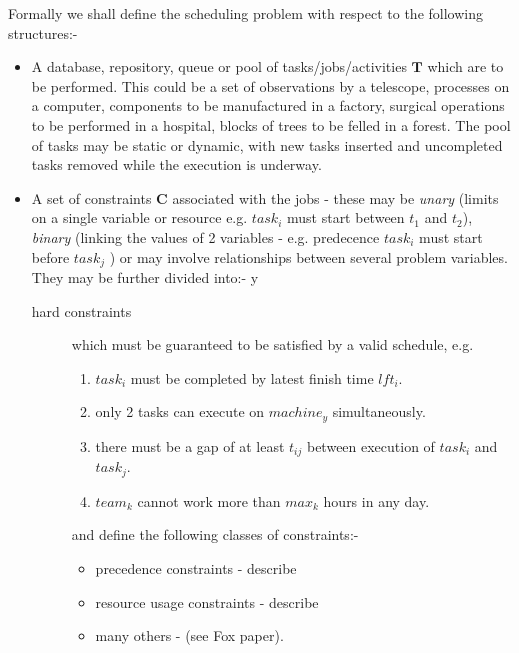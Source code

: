 Formally we shall define the scheduling problem with respect to the following structures:-

\begin{itemize}
\item A database, repository, queue or pool of tasks/jobs/activities $\mathbf{T}$ which are to be performed. This could be a set of observations by a telescope, processes on a computer, components to be manufactured in a factory, surgical operations to be performed in a hospital, blocks of trees to be felled in a forest. The pool of tasks may be static or dynamic, with new tasks inserted and uncompleted tasks removed while the execution is underway.

 \item A set of constraints $\mathbf{C}$ associated with the jobs - these may be \emph{unary} (limits on a single variable or resource e.g. $task_i$ must start between $t_1$ and $t_2$), \emph{binary} (linking the values of 2 variables - e.g. predecence $task_i$ must start before $task_j$ ) or may involve relationships between several problem variables. They may be further divided into:-
y\begin{description} 
\item[hard constraints] which must be guaranteed to be satisfied by a valid schedule, e.g. 
\begin{enumerate}
\item $task_i$ must be completed by latest finish time $lft_i$.
\item only 2 tasks can execute on $machine_y$ simultaneously.
\item there must be a gap of at least $t_{ij}$ between execution of $task_i$ and $task_j$.
\item $team_k$ cannot work more than $max_k$ hours in any day.
\end{enumerate}

\cite{sadeh91lookahead} and \cite{fox83thesis} define the following classes of constraints:-
\begin{itemize}
 \item  precedence constraints - describe
 \item  resource usage constraints - describe
 \item  many others - (see Fox paper).
\end{itemize}


\end{description}
\end{itemize}
